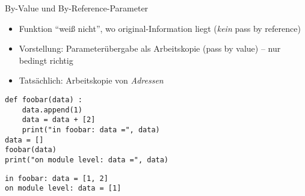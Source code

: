 
\begin{frame}[fragile]{By-Value und By-Reference-Parameter}
%
\begin{itemize}
\item Funktion \enquote{weiß nicht}, wo original-Information liegt (\emph{kein} pass by reference)
\item Vorstellung: Parameterübergabe als Arbeitskopie (pass by value) -- nur bedingt richtig
\item Tatsächlich: Arbeitskopie von \emph{Adressen}
\end{itemize}
%
\begin{tcbraster}[raster columns=2,
                  raster equal height,
                  nobeforeafter,
                  raster column skip=0.5cm]
\begin{codebox}
\begin{verbatim}
def foobar(data) :
    data.append(1)
    data = data + [2]
    print("in foobar: data =", data)
data = []
foobar(data)
print("on module level: data =", data)
\end{verbatim}
\end{codebox}
%
\begin{cmdbox}
\begin{verbatim}
in foobar: data = [1, 2]
on module level: data = [1]
\end{verbatim}
\end{cmdbox}
\end{tcbraster}
%
\end{frame}


